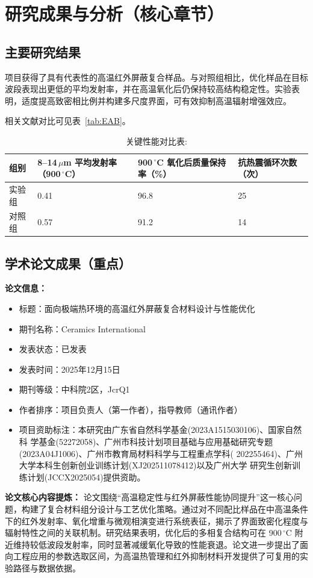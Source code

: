 \chapter{研究成果与分析（核心章节）}

\section{主要研究结果}
项目获得了具有代表性的高温红外屏蔽复合样品。与对照组相比，优化样品在目标波段表现出更低的平均发射率，并在高温氧化后仍保持较高结构稳定性。实验表明，适度提高致密相比例并构建多尺度界面，可有效抑制高温辐射增强效应。

相关文献对比可见表~\ref{tab:EAB}。

\begin{table}[H]
\centering
\caption{关键性能对比表:}
\begin{tabularx}{0.95\textwidth}{C{2.2cm}C{3.2cm}C{3.2cm}C{3.2cm}}
\toprule
组别 & 8--14\,$\mu$m 平均发射率（900\,$^{\circ}$C） & 900\,$^{\circ}$C 氧化后质量保持率（\%） & 抗热震循环次数（次） \\
\midrule
实验组 & 0.41 & 96.8 & 25 \\
对照组 & 0.57 & 91.2 & 14 \\
\bottomrule
\end{tabularx}
\end{table}

\section{学术论文成果（重点）}
\noindent\textbf{论文信息：}
\begin{itemize}
  \item 标题：面向极端热环境的高温红外屏蔽复合材料设计与性能优化
  \item 期刊名称：Ceramics International
  \item 发表状态：已发表
  \item 发表时间：2025年12月15日
  \item 期刊等级：中科院2区，JcrQ1
  \item 作者排序：项目负责人（第一作者），指导教师（通讯作者）
  \item 项目资助标注：本研究由广东省自然科学基金(2023A1515030106)、国家自然科 学基金(52272058)、广州市科技计划项目基础与应用基础研究专题 (2023A04J1006)、广州市教育局材料科学与工程重点学科( 202255464)、广州大学本科生创新创业训练计划(XJ202511078412)以及广州大学 研究生创新训练计划(JCCX2025054)提供资助。
\end{itemize}

\noindent\textbf{论文核心内容提炼：}
论文围绕“高温稳定性与红外屏蔽性能协同提升”这一核心问题，构建了复合材料组分设计与工艺优化策略。通过对不同配比样品在中高温条件下的红外发射率、氧化增重与微观相演变进行系统表征，揭示了界面致密化程度与辐射特性之间的关联机制。研究结果表明，优化后的多相复合结构可在 900\,$^{\circ}$C 附近维持较低波段发射率，同时显著减缓氧化导致的性能衰退。论文进一步提出了面向工程应用的参数选取区间，为高温热管理和红外抑制材料开发提供了可复用的实验路径与数据依据。
